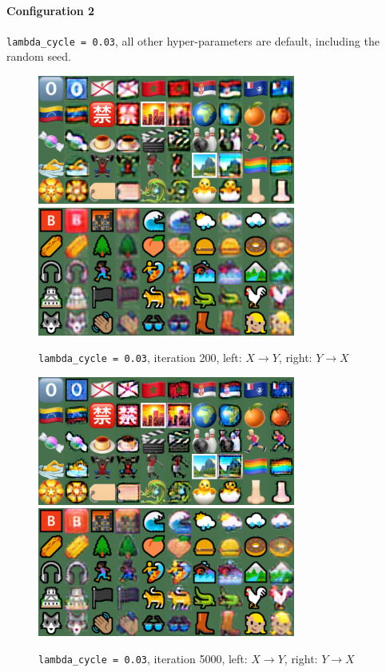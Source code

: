 \documentclass{article}
\begin{document}
	\paragraph{Configuration 2} \texttt{lambda\_cycle = 0.03}, all other hyper-parameters are default, including the random seed.
	\begin{figure}[H]
		\centering
		\caption{ \texttt{lambda\_cycle = 0.03}, iteration 200, left: $X \to Y$, right: $Y \to X$}
		\includegraphics[width=0.45\linewidth]{./samples_cyclegan_Q3_lambda0_03/sample-000200-X-Y.png}
		\includegraphics[width=0.45\linewidth]{./samples_cyclegan_Q3_lambda0_03/sample-000200-Y-X.png}
	\end{figure}
	\begin{figure}[H]
		\centering
		\caption{ \texttt{lambda\_cycle = 0.03}, iteration 5000, left: $X \to Y$, right: $Y \to X$}
		\includegraphics[width=0.45\linewidth]{./samples_cyclegan_Q3_lambda0_03/sample-005000-X-Y.png}
		\includegraphics[width=0.45\linewidth]{./samples_cyclegan_Q3_lambda0_03/sample-005000-Y-X.png}
	\end{figure}
\end{document}
